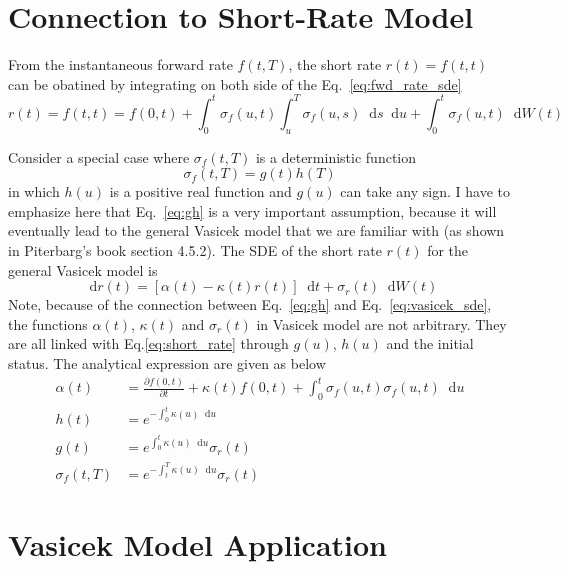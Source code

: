 \documentclass[12pt]{article}
\newcommand{\dd}{\mathop{}\!\text{d}}
\newcommand{\qBrownian}[1]{W(#1)}
\newcommand{\sigmaf}{\sigma_f}
\newcommand{\sigmar}{\sigma_r}
\begin{document}
\section{Connection to Short-Rate Model}
From the instantaneous forward rate $f(t, T)$,
the short rate $r(t) = f(t,t)$ can be obatined by integrating on both side
of the Eq.~\ref{eq:fwd_rate_sde}
\begin{equation}
    \label{eq:short_rate}
    r(t) = f(t,t) = f(0, t) + \int_0^t \sigmaf(u,t) \int_u^T
    \sigmaf(u,s) \dd s \dd u + \int_0^t \sigmaf(u, t) \dd \qBrownian{t}
\end{equation}

Consider a special case where $\sigmaf(t,T)$ is a deterministic function
\begin{equation}
    \label{eq:gh}
    \sigmaf(t, T) = g(t) h(T)
\end{equation}
in which $h(u)$ is a positive real function and $g(u)$ can take any sign.
I have to emphasize here that Eq.~\ref{eq:gh} is a very important assumption, because
it will eventually lead to the general Vasicek model that we are familiar with
(as shown in Piterbarg's book section 4.5.2). The SDE of the short rate $r(t)$
for the general Vasicek model is
\begin{equation}
    \label{eq:vasicek_sde}
    \dd r(t) = \left[\alpha(t) -\kappa(t)r(t)\right] \dd t + \sigmar(t) \dd \qBrownian{t}
\end{equation}
Note, because of the connection between Eq.~\ref{eq:gh} and Eq.~\ref{eq:vasicek_sde},
the functions $\alpha(t)$, $\kappa(t)$ and $\sigmar(t)$ in Vasicek model are not arbitrary.
They are all linked with Eq.\ref{eq:short_rate} through $g(u)$, $h(u)$ and the initial status.
The analytical expression are given as below
\begin{align}
    \alpha(t) &= \frac{\partial f(0, t)}{\partial t} + \kappa(t) f(0, t) +
        \int_0^t \sigmaf(u,t)\sigmaf(u,t)\dd u\\
    h(t) &= e^{-\int_0^t \kappa(u) \dd u} \\
    g(t) &= e^{\int_0^t \kappa(u) \dd u} \sigmar(t) \\
    \sigmaf(t, T) &= e^{-\int_t^T \kappa(u) \dd u } \sigmar(t)
\end{align}

\section{Vasicek Model Application}
\end{document}
